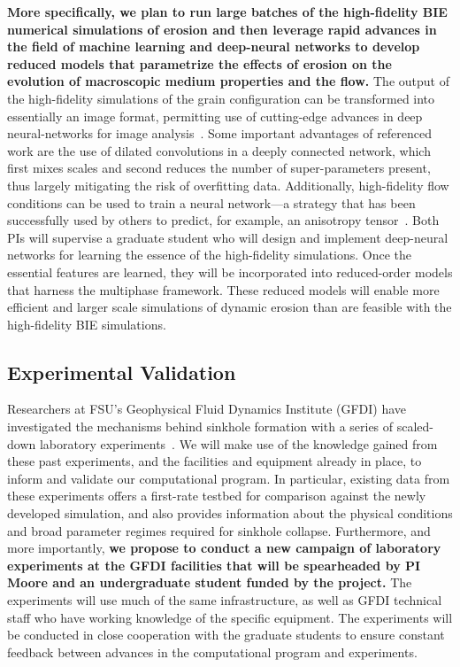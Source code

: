 \documentclass[11pt]{article}
\begin{document}
{\bf More specifically, we plan to run large batches of the high-fidelity BIE numerical simulations of erosion and then leverage rapid advances in the field of machine learning and deep-neural networks \cite{ling2016reynolds, kutz2017deep, ling2016machine, pelt2018mixed} to develop reduced models that parametrize the effects of erosion on the evolution of macroscopic medium properties and the flow.}  The output of the high-fidelity simulations of the grain configuration can be transformed into essentially an image format, permitting use of cutting-edge advances in deep neural-networks for image analysis~\cite{pelt2018mixed}. Some important advantages of referenced work are the use of dilated convolutions in a deeply connected network, which first mixes scales and second reduces the number of super-parameters present, thus largely mitigating the risk of overfitting data. Additionally, high-fidelity flow conditions can be used to train a neural network---a strategy that has been successfully used by others to predict, for example, an anisotropy tensor~\cite{ling2016reynolds}.  Both PIs will supervise a graduate student who will design and implement deep-neural networks for learning the essence of the high-fidelity simulations. Once the essential features are learned, they will be incorporated into reduced-order models that harness the multiphase framework. These reduced models will enable more efficient and larger scale simulations of dynamic erosion than are feasible with the high-fidelity BIE simulations.

\subsection{Experimental Validation}
\label{sec:experiments}

Researchers at FSU's Geophysical Fluid Dynamics Institute (GFDI) have
investigated the mechanisms behind sinkhole formation with a series of
scaled-down laboratory experiments~\cite{tao2014experimental}. We will
make use of the knowledge gained from these past experiments, and the
facilities and equipment already in place, to inform and validate our
computational program. In particular, existing data from these
experiments offers a first-rate testbed for comparison against the newly
developed simulation, and also provides information about the physical
conditions and broad parameter regimes required for sinkhole collapse. Furthermore, and more importantly, {\bf we propose to conduct a new campaign of laboratory experiments at the GFDI facilities that will be spearheaded by PI Moore and an undergraduate student funded by the project.} The experiments will use much of the same infrastructure, as well as GFDI technical staff who have working knowledge of the specific equipment. The experiments will be conducted in close cooperation with the graduate students to ensure constant feedback between advances in the computational program and experiments.
\end{document}
